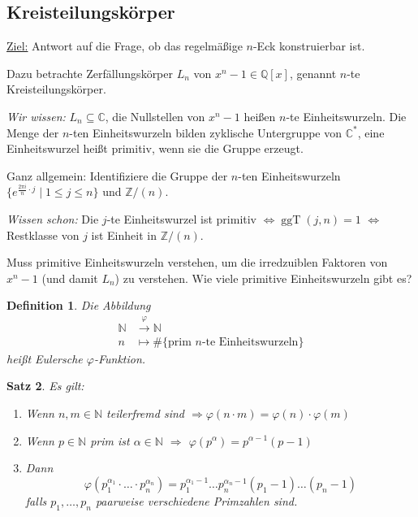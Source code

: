 \documentclass[a4paper,12pt,numbers=noenddot,parskip=full]{scrartcl}
\newcommand{\setN}{\mathbb{N}}
\newcommand{\setZ}{\mathbb{Z}}
\newcommand{\setQ}{\mathbb{Q}}
\newcommand{\setC}{\mathbb{C}}
\newcommand{\heading}{\underline}
\theoremstyle{dotless}
\newtheorem{theorem}{Satz}[section]
\newtheorem{definition}[theorem]{Definition}
\theoremstyle{remark}
\begin{document}
	\subsection{Kreisteilungskörper}
	
	\heading{Ziel:} Antwort auf die Frage, ob das regelmäßige $n$-Eck konstruierbar ist.
	
	Dazu betrachte Zerfällungskörper $L_n$ von $x^n - 1 \in \setQ[x]$, genannt $n$-te Kreisteilungskörper.
	
	\textit{Wir wissen:} $L_n \subseteq \setC$, die Nullstellen von $x^n -1$ heißen $n$-te Einheitswurzeln. Die Menge der $n$-ten Einheitswurzeln bilden zyklische Untergruppe von $\setC^*$, eine Einheitswurzel heißt primitiv, wenn sie die Gruppe erzeugt.
	
	Ganz allgemein: Identifiziere die Gruppe der $n$-ten Einheitswurzeln $\{ e^{\frac{2\pi i}{n} \cdot j} \mid 1 \leq j \leq n \}$ und $\setZ/(n)$.
	
	\textit{Wissen schon:} Die $j$-te Einheitswurzel ist primitiv $\Leftrightarrow \operatorname{ggT}(j,n) = 1$ $\Leftrightarrow$ Restklasse von $j$ ist Einheit in $\setZ/(n)$.
	
	Muss primitive Einheitswurzeln verstehen, um die irredzuiblen Faktoren von $x^n -1$ (und damit $L_n$) zu verstehen. Wie viele primitive Einheitswurzeln gibt es?
	
	\begin{definition}
		Die Abbildung
		\begin{align*}
			\setN &\overset{\varphi}{\longrightarrow} \setN \\
			n &\mapsto \# \{ \text{prim $n$-te Einheitswurzeln} \}
		\end{align*}
		heißt Eulersche $\varphi$-Funktion.
	\end{definition}

	\begin{theorem}
		Es gilt:
		\begin{enumerate}
			\item Wenn $n,m \in \setN$ teilerfremd sind $\Rightarrow \varphi(n \cdot m) = \varphi(n) \cdot \varphi(m)$
			\item Wenn $p \in \setN$ prim ist $\alpha \in \setN$ $\Rightarrow$ $\varphi(p^\alpha) = p^{\alpha - 1}(p-1)$
			\item Dann
			\begin{equation*}
				\varphi(p_1^{\alpha_1} \cdot \dots \cdot p_n^{\alpha_n}) = p_1^{\alpha_1 - 1} \dots p_n^{\alpha_n - 1} (p_1 - 1) \dots (p_n - 1)
			\end{equation*}
			falls $p_1, \dots, p_n$ paarweise verschiedene Primzahlen sind.
		\end{enumerate}
	\end{theorem}
\end{document}

